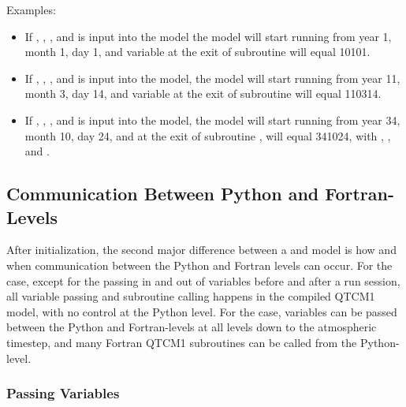 Examples:
\begin{itemize}
\item If , 
	, 
	, and
	 is input into 
	the model the model will start running from year 1, month 1, day 1,
	and 
	variable  at the exit of 
	subroutine 
	will equal 10101.

\item If ,
	, 
	,
	and  is input into the
	model, the model will start running from year 11, month 3, day 14,
	and 
	variable  at the exit of 
	subroutine  will equal
	110314.

\item If ,
	, 
	,
	and  is input into the
	model, the model will start running from year 34, month 10, day 24,
	and at the exit of subroutine 
	,  will equal
	341024, with ,
	, and
	.
\end{itemize}


	\subsection{Communication Between Python and Fortran-Levels}
				\label{sec:comm.py.fort.compiledform}

After initialization, the second major difference between a
 and  model is how and when communication
between the Python and Fortran levels can occur.  For the 
case, except for the passing in and out of variables before and after
a run session, all variable passing and subroutine calling happens in
the compiled QTCM1 model, with no control at the Python level.
For the  case, variables can be passed between the
Python and Fortran-levels at all levels down to the atmospheric
timestep, and many Fortran QTCM1 subroutines can be called from the
Python-level.  


		\subsubsection{Passing Variables}

